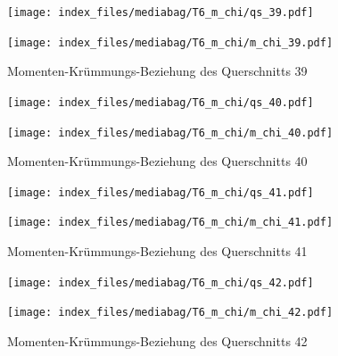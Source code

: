 \documentclass[
  11pt,
  letterpaper,
]{scrreprt}
\begin{document}
\begin{figure}[H]

\begin{minipage}{0.50\linewidth}
\texttt{[image: index\_files/mediabag/T6\_m\_chi/qs\_39.pdf]}\end{minipage}%
%
\begin{minipage}{0.50\linewidth}
\texttt{[image: index\_files/mediabag/T6\_m\_chi/m\_chi\_39.pdf]}\end{minipage}%

\caption{\label{fig-m_chi_appendix}Momenten-Krümmungs-Beziehung des
Querschnitts 39}

\end{figure}%

\begin{figure}[H]

\begin{minipage}{0.50\linewidth}
\texttt{[image: index\_files/mediabag/T6\_m\_chi/qs\_40.pdf]}\end{minipage}%
%
\begin{minipage}{0.50\linewidth}
\texttt{[image: index\_files/mediabag/T6\_m\_chi/m\_chi\_40.pdf]}\end{minipage}%

\caption{\label{fig-m_chi_appendix}Momenten-Krümmungs-Beziehung des
Querschnitts 40}

\end{figure}%

\begin{figure}[H]

\begin{minipage}{0.50\linewidth}
\texttt{[image: index\_files/mediabag/T6\_m\_chi/qs\_41.pdf]}\end{minipage}%
%
\begin{minipage}{0.50\linewidth}
\texttt{[image: index\_files/mediabag/T6\_m\_chi/m\_chi\_41.pdf]}\end{minipage}%

\caption{\label{fig-m_chi_appendix}Momenten-Krümmungs-Beziehung des
Querschnitts 41}

\end{figure}%

\begin{figure}[H]

\begin{minipage}{0.50\linewidth}
\texttt{[image: index\_files/mediabag/T6\_m\_chi/qs\_42.pdf]}\end{minipage}%
%
\begin{minipage}{0.50\linewidth}
\texttt{[image: index\_files/mediabag/T6\_m\_chi/m\_chi\_42.pdf]}\end{minipage}%

\caption{\label{fig-m_chi_appendix}Momenten-Krümmungs-Beziehung des
Querschnitts 42}

\end{figure}%
\end{document}
